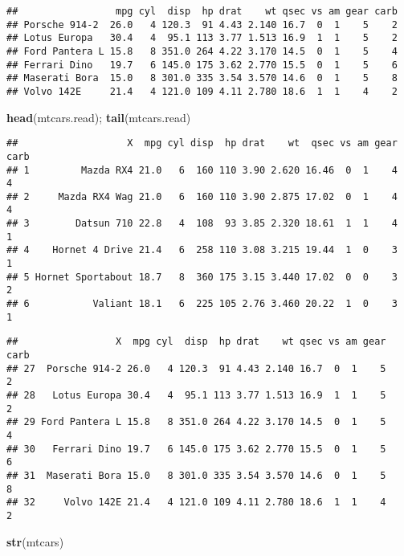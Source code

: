 \documentclass[]{article}
\newenvironment{Shaded}{\begin{snugshade}}{\end{snugshade}}
\newcommand{\KeywordTok}[1]{\textcolor[rgb]{0.13,0.29,0.53}{\textbf{#1}}}
\newcommand{\NormalTok}[1]{#1}
\begin{document}
\begin{verbatim}
##                 mpg cyl  disp  hp drat    wt qsec vs am gear carb
## Porsche 914-2  26.0   4 120.3  91 4.43 2.140 16.7  0  1    5    2
## Lotus Europa   30.4   4  95.1 113 3.77 1.513 16.9  1  1    5    2
## Ford Pantera L 15.8   8 351.0 264 4.22 3.170 14.5  0  1    5    4
## Ferrari Dino   19.7   6 145.0 175 3.62 2.770 15.5  0  1    5    6
## Maserati Bora  15.0   8 301.0 335 3.54 3.570 14.6  0  1    5    8
## Volvo 142E     21.4   4 121.0 109 4.11 2.780 18.6  1  1    4    2
\end{verbatim}

\begin{Shaded}
\begin{Highlighting}[]
\KeywordTok{head}\NormalTok{(mtcars.read); }\KeywordTok{tail}\NormalTok{(mtcars.read)}
\end{Highlighting}
\end{Shaded}

\begin{verbatim}
##                   X  mpg cyl disp  hp drat    wt  qsec vs am gear carb
## 1         Mazda RX4 21.0   6  160 110 3.90 2.620 16.46  0  1    4    4
## 2     Mazda RX4 Wag 21.0   6  160 110 3.90 2.875 17.02  0  1    4    4
## 3        Datsun 710 22.8   4  108  93 3.85 2.320 18.61  1  1    4    1
## 4    Hornet 4 Drive 21.4   6  258 110 3.08 3.215 19.44  1  0    3    1
## 5 Hornet Sportabout 18.7   8  360 175 3.15 3.440 17.02  0  0    3    2
## 6           Valiant 18.1   6  225 105 2.76 3.460 20.22  1  0    3    1
\end{verbatim}

\begin{verbatim}
##                 X  mpg cyl  disp  hp drat    wt qsec vs am gear carb
## 27  Porsche 914-2 26.0   4 120.3  91 4.43 2.140 16.7  0  1    5    2
## 28   Lotus Europa 30.4   4  95.1 113 3.77 1.513 16.9  1  1    5    2
## 29 Ford Pantera L 15.8   8 351.0 264 4.22 3.170 14.5  0  1    5    4
## 30   Ferrari Dino 19.7   6 145.0 175 3.62 2.770 15.5  0  1    5    6
## 31  Maserati Bora 15.0   8 301.0 335 3.54 3.570 14.6  0  1    5    8
## 32     Volvo 142E 21.4   4 121.0 109 4.11 2.780 18.6  1  1    4    2
\end{verbatim}

\begin{Shaded}
\begin{Highlighting}[]
\KeywordTok{str}\NormalTok{(mtcars)}
\end{Highlighting}
\end{Shaded}
\end{document}
